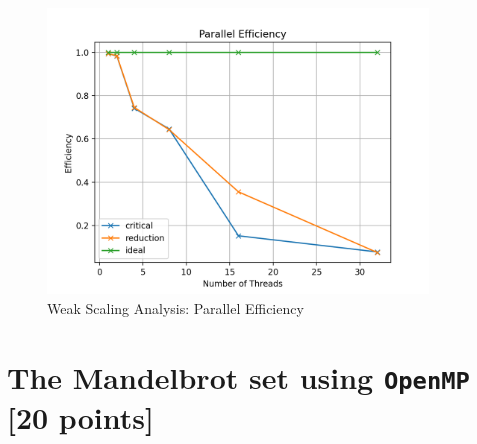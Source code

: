 \documentclass[unicode,11pt,a4paper,oneside,numbers=endperiod,openany]{scrartcl}
\begin{document}
\begin{figure}[H]
    \centering
    \includegraphics[width=0.9\textwidth]{Images_Output/parallel_efficiency.png}
    \caption{Weak Scaling Analysis: Parallel Efficiency}
    \label{fig:weak_scaling}
  \end{figure}

\section{The Mandelbrot set  using \texttt{OpenMP} [20 points]}
\end{document}
